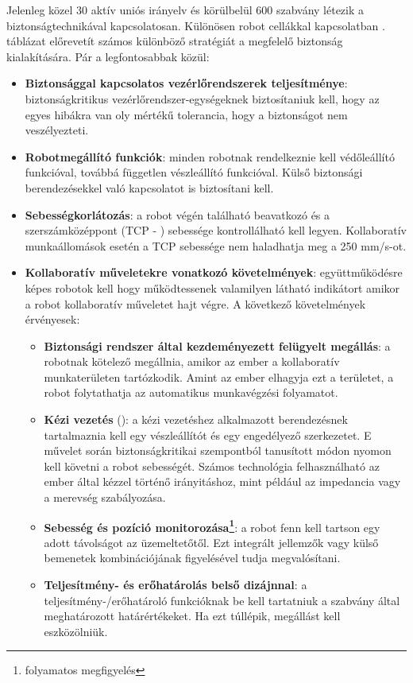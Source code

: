 \documentclass[../documentation.tex]{subfiles}
\begin{document}
Jelenleg közel 30 aktív uniós irányelv és körülbelül 600 szabvány létezik a biztonságtechnikával kapcsolatosan. Különösen robot cellákkal kapcsolatban . táblázat előrevetít számos különböző stratégiát a megfelelő biztonság kialakítására. Pár a legfontosabbak közül\cite{safehrc}:
\begin{itemize}
	\item \textbf{Biztonsággal kapcsolatos vezérlőrendszerek teljesítménye}: biztonságkritikus vezérlőrendszer-egységeknek biztosítaniuk kell, hogy az egyes hibákra van oly mértékű tolerancia, hogy a biztonságot nem veszélyezteti.
	\item \textbf{Robotmegállító funkciók}: minden robotnak rendelkeznie kell védőleállító funkcióval, továbbá független vészleállító funkcióval. Külső biztonsági berendezésekkel való kapcsolatot is biztosítani kell.
	\item \textbf{Sebességkorlátozás}: a robot végén található beavatkozó és a szerszámközéppont (TCP - ) sebessége kontrollálható kell legyen. Kollaboratív munkaállomások esetén a TCP sebessége nem haladhatja meg a 250 mm/s-ot.
	\item \textbf{Kollaboratív műveletekre vonatkozó követelmények}: együttműködésre képes robotok kell hogy működtessenek valamilyen látható indikátort amikor a robot kollaboratív műveletet hajt végre. A következő követelmények érvényesek:
	\begin{itemize}
		\item \textbf{Biztonsági rendszer által kezdeményezett felügyelt megállás}: a robotnak kötelező megállnia, amikor az ember a kollaboratív munkaterületen tartózkodik. Amint az ember elhagyja ezt a területet, a robot folytathatja az automatikus munkavégzési folyamatot.
		\item \textbf{Kézi vezetés} (): a kézi vezetéshez alkalmazott berendezésnek tartalmaznia kell egy vészleállítót és egy engedélyező szerkezetet. E művelet során biztonságkritikai szempontból tanusított módon nyomon kell követni a robot sebességét. Számos technológia felhasználható az ember által kézzel történő irányitáshoz, mint például az impedancia vagy a merevség szabályozása.
		\item \textbf{Sebesség és pozíció monitorozása\footnote{folyamatos megfigyelés}}: a robot fenn kell tartson egy adott távolságot az üzemeltetőtől. Ezt integrált jellemzők vagy külső bemenetek kombinációjának figyelésével tudja megvalósítani.
		\item \textbf{Teljesítmény- és erőhatárolás belső dizájnnal}: a teljesítmény-/erőhatároló funkcióknak be kell tartatniuk a szabvány által meghatározott határértékeket. Ha ezt túllépik, megállást kell eszközölniük.

\end{itemize}
\end{itemize}
\end{document}
